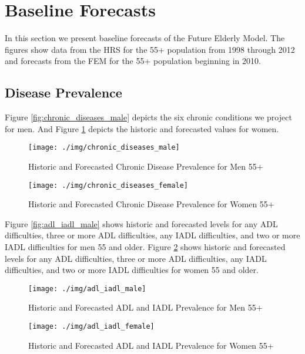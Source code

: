 \section{Baseline Forecasts}
In this section we present baseline forecasts of the Future Elderly Model.  The figures show data from the HRS for the 55+ population from 1998 through 2012 and 
forecasts from the FEM for the 55+ population beginning in 2010.

\subsection{Disease Prevalence}
Figure \ref{fig:chronic_diseases_male} depicts the six chronic conditions we project for men.  And Figure \ref{fig:chronic_diseases_female} depicts the historic 
and forecasted values for women.

\begin{figure}[ht!]
\centering

\texttt{[image: ./img/chronic\_diseases\_male]}
\caption{Historic and Forecasted Chronic Disease Prevalence for Men 55+}
\label{fig:chronic_diseases_male} 

\texttt{[image: ./img/chronic\_diseases\_female]}
\caption{Historic and Forecasted Chronic Disease Prevalence for Women 55+}
\label{fig:chronic_diseases_female} 
\end{figure}

Figure \ref{fig:adl_iadl_male} shows historic and forecasted levels for any ADL difficulties, three or more ADL difficulties, any IADL difficulties, and
two or more IADL difficulties for men 55 and older. Figure \ref{fig:adl_iadl_female} shows historic and forecasted levels for any ADL difficulties, three or 
more ADL difficulties, any IADL difficulties, and two or more IADL difficulties for women 55 and older.

\begin{figure}[ht!]
\centering

\texttt{[image: ./img/adl\_iadl\_male]}
\caption{Historic and Forecasted ADL and IADL Prevalence for Men 55+}
\label{fig:adl_iadl_male} 

\texttt{[image: ./img/adl\_iadl\_female]}
\caption{Historic and Forecasted ADL and IADL Prevalence for Women 55+}
\label{fig:adl_iadl_female} 
\end{figure}
